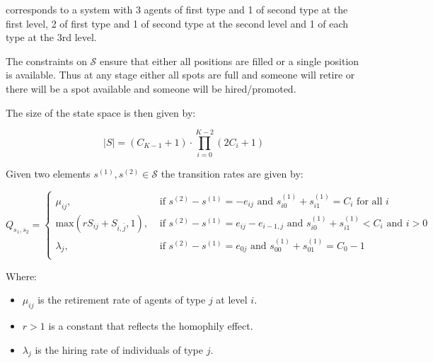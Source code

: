 \documentclass{article}
\renewcommand{\S}{\mathcal{S}}
\begin{document}
corresponds to a system with 3 agents of first type and 1 of second type at the
first level, 2 of first type and 1 of second type at the second level and 1 of
each type at the 3rd level.

The constraints on \(\S\) ensure that either all positions are filled or a
single position is available. Thus at any stage either all spots are full and
someone will retire or there will be a spot available and someone will be
hired/promoted.

The size of the state space is then given by:

\begin{equation}
    |S| = (C_{K - 1} + 1)\cdot \prod_{i=0}^{K - 2}\left(2C_i + 1\right)
\end{equation}

Given two elements \(s^{(1)}, s^{(2)}\in \S\) the transition rates are given by:

\begin{equation}\label{eqn:transition_rates}
    Q_{s_1, s_2} =
        \begin{cases}
            \mu_{ij},& \text{ if }s^{(2)} - s^{(1)} = -e_{ij}
            \text{ and }s^{(1)}_{i0} + s^{(1)}_{i1} = C_i\text{ for all }i\\
           \text{max}(rS_{ij} + S_{i, \bar j}, 1),& \text{ if }s^{(2)} - s^{(1)} = e_{ij} - e_{i-1, j}
                                     \text{ and }s^{(1)}_{i0} + s^{(1)}_{i1} < C_{i}
                                     \text{ and }i > 0\\
           \lambda_{j},&\text{ if }s^{(2)} - s^{(1)} = e_{0j}
                        \text{ and }s^{(1)}_{00} + s^{(1)}_{01} = C_{0} - 1\\
        \end{cases}
\end{equation}

Where:

\begin{itemize}
    \item \(\mu_{ij}\) is the retirement rate of agents of type \(j\) at level
        \(i\).
    \item \(r > 1\) is a constant that reflects the homophily effect.
    \item \(\lambda_j\) is the hiring rate of individuals of type \(j\).
\end{itemize}

\end{document}
